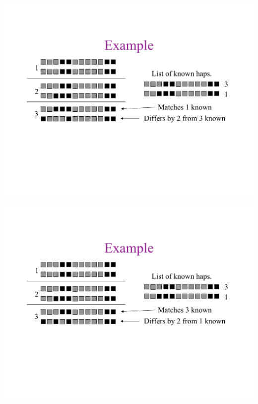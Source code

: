 \newslide{}
\mbox{}
\vspace*{\VertUp}
\enlargethispage*{1000pt}
\begin{center}
\includegraphics*[width=\textwidth]{PPT_pages/pg_0033.pdf}
\end{center}


\newslide{}
\mbox{}
\vspace*{\VertUp}
\enlargethispage*{1000pt}
\begin{center}
\includegraphics*[width=\textwidth]{PPT_pages/pg_0034.pdf}
\end{center}


